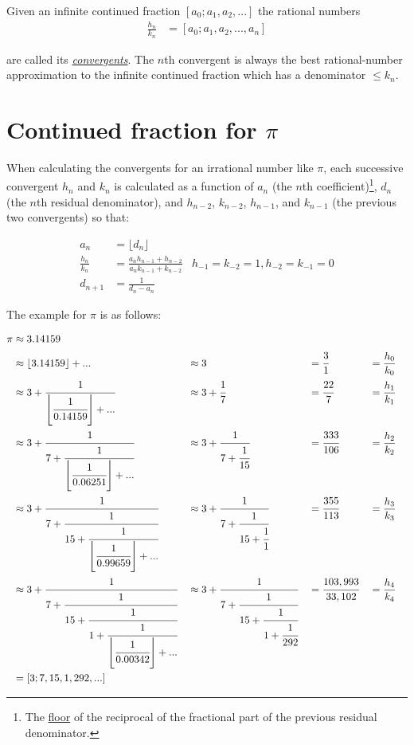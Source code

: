 \documentclass[11pt]{article}%
\begin{document}
Given an infinite continued fraction $[a_0; a_1, a_2, ... ]$ the rational numbers
\begin{align}
\frac{h_n}{k_n} &= [a_0; a_1, a_2, ..., a_n]
\end{align}

are called its {\em \href{https://en.wikipedia.org/wiki/Convergent_(continued_fraction)}{convergents}}. The $n$th convergent is always the best rational-number approximation to the infinite continued fraction which has a denominator $\le k_n$.

\section{Continued fraction for \(\pi\)}
\label{ContinuedIrrational}

When calculating the convergents for an irrational number like \(\pi\), each successive convergent $h_n$ and $k_n$ is calculated as a function of $a_n$ (the $n$th coefficient)\footnote{The \href{http://en.wikipedia.org/wiki/Floor_and_ceiling_functions}{floor} of the reciprocal of the fractional part of the previous residual denominator.}, $d_n$ (the $n$th residual denominator), and $h_{n-2}$,  $k_{n-2}$,  $h_{n-1}$, and $k_{n-1}$ (the previous two convergents) so that:

\begin{align}
a_n &= \lfloor d_n \rfloor  \\
 \frac{h_n}{k_n} &= \frac{a_nh_{n-1} + h_{n-2}}{a_nk_{n-1} + k_{n-2}} &h_{-1} = k_{-2} = 1, h_{-2} = k_{-1} = 0 \\
 d_{n + 1} &= \frac{1}{d_n - a_n}
\end{align} 

The example for \(\pi\) is as follows:

\begin{align}
\pi &\approx 3.14159  \\
 &\approx \lfloor 3.14159 \rfloor + ... &&\approx 3 &&= \cfrac{3}{1} &&= \frac{h_0}{k_0} \\
 &\approx 3 + \cfrac{1}{\left\lfloor \cfrac{1}{0.14159} \right\rfloor + ...} &&\approx 3 + \cfrac{1}{7} &&= \cfrac{22}{7} &&= \frac{h_1}{k_1} \\
 &\approx 3 + \cfrac{1}{7 + \cfrac{1}{\left\lfloor \cfrac{1}{0.06251} \right\rfloor + ...}} &&\approx 3 + \cfrac{1}{7 + \cfrac{1}{15}} &&= \cfrac{333}{106} &&= \frac{h_2}{k_2} \\
 &\approx 3 + \cfrac{1}{7 + \cfrac{1}{15 + \cfrac{1}{\left\lfloor \cfrac{1}{0.99659} \right\rfloor + ...}}} &&\approx 3 + \cfrac{1}{7 + \cfrac{1}{15 + \cfrac{1}{1}}} &&= \cfrac{355}{113} &&= \frac{h_3}{k_3} \\
 &\approx 3 + \cfrac{1}{7 + \cfrac{1}{15 + \cfrac{1}{1 + \cfrac{1}{\left\lfloor \cfrac{1}{0.00342} \right\rfloor + ...}}}} &&\approx 3 + \cfrac{1}{7 + \cfrac{1}{15 + \cfrac{1}{1 + \cfrac{1}{292}}}} &&= \cfrac{103,993}{33,102} &&= \frac{h_4}{k_4} \\
 &= [3; 7, 15, 1, 292, ...] 
\end{align}
\end{document}
